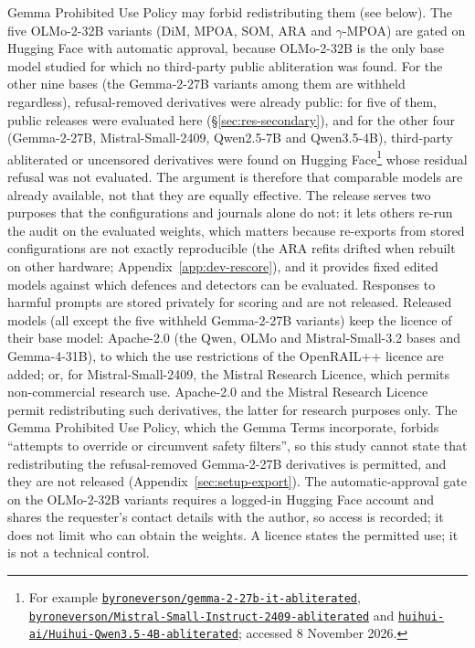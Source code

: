 \documentclass{article}
\begin{document}
Gemma Prohibited Use Policy may forbid redistributing them (see below). The
five OLMo-2-32B variants (DiM, MPOA, SOM, ARA and $\gamma$-MPOA) are gated on
Hugging Face with automatic approval, because OLMo-2-32B is the only base model
studied for which no third-party public abliteration was found. For the other nine bases
(the Gemma-2-27B variants among them are withheld regardless),
refusal-removed derivatives were already public: for five of them, public
releases were evaluated here (\S\ref{sec:res-secondary}), and for the other
four (Gemma-2-27B, Mistral-Small-2409, Qwen2.5-7B and Qwen3.5-4B),
third-party abliterated or uncensored derivatives were found on Hugging
Face\footnote{For example
\href{https://huggingface.co/byroneverson/gemma-2-27b-it-abliterated}{\nolinkurl{byroneverson/gemma-2-27b-it-abliterated}},
\href{https://huggingface.co/byroneverson/Mistral-Small-Instruct-2409-abliterated}{\nolinkurl{byroneverson/Mistral-Small-Instruct-2409-abliterated}}
and
\href{https://huggingface.co/huihui-ai/Huihui-Qwen3.5-4B-abliterated}{\nolinkurl{huihui-ai/Huihui-Qwen3.5-4B-abliterated}};
accessed 8 November 2026.}
whose residual refusal was not evaluated. The argument is therefore that
comparable models are already available, not that they are equally effective.
The release serves two purposes that the configurations and journals alone do
not: it lets others re-run the audit on the evaluated weights, which matters
because re-exports from stored configurations are not exactly reproducible
(the ARA refits drifted when rebuilt on other hardware;
Appendix~\ref{app:dev-rescore}), and it provides fixed edited models against
which defences and detectors can be evaluated. Responses to harmful prompts
are stored privately for scoring and are not released. Released models (all
except the five withheld Gemma-2-27B variants) keep the licence of their base model: Apache-2.0 (the Qwen, OLMo and
Mistral-Small-3.2 bases and Gemma-4-31B), to which the use restrictions of
the OpenRAIL++ licence are added; or, for Mistral-Small-2409, the Mistral Research
Licence, which permits non-commercial research use. Apache-2.0 and the
Mistral Research Licence permit redistributing such derivatives, the latter
for research purposes only. The Gemma Prohibited Use Policy, which the Gemma
Terms incorporate, forbids ``attempts to override or circumvent safety
filters'', so this study cannot state that redistributing the refusal-removed
Gemma-2-27B derivatives is permitted, and they are not released
(Appendix~\ref{sec:setup-export}). The
automatic-approval gate on the OLMo-2-32B variants requires a logged-in
Hugging Face account and shares the requester's contact details with the
author, so access is recorded; it does not limit who can obtain the weights. A licence states the permitted use; it is not a
technical control.
\end{document}

